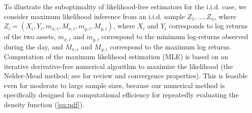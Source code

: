 To illustrate the suboptimality of likelihood-free estimators for the
i.i.d. case, we consider maximum likelihood inference from an
i.i.d. sample $Z_1, \ldots, Z_n$, where
$Z_i = (X_i, Y_i, m_{x,i}, M_{x,i}, m_{y,i}, M_{y,i})$, where $X_i$
and $Y_i$ corresponds to log returns of the two assets, $m_{x,i}$ and
$m_{y,i}$ correspond to the minimum log-returns observed during the
day, and $M_{x,i}$ and $M_{y,i}$ correspond to the maximum log
returns.
Computation of the maximum likelihood estimation (MLE) is based on an
iterative derivative-free numerical algorithm to maximize the
likelihood (the Nelder-Mead method; see \cite{lagarias1998convergence}
for review and convergence properties). This is feasible even for
moderate to large sample sizes, because our numerical method is
specifically designed for computational efficiency for repeatedly
evaluating the density function (\ref{eq:pdf}).

